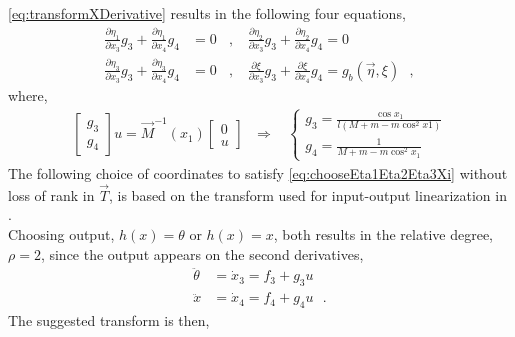 \autoref{eq:transformXDerivative} results in the following four equations,
\begin{align}
    \frac{\partial \eta_1}{\partial x_3} g_3 + \frac{\partial \eta_1}{\partial x_4} g_4 &= 0                    \ \ \ \ ,\ \ \ \ %
    \frac{\partial \eta_2}{\partial x_3} g_3 + \frac{\partial \eta_2}{\partial x_4} g_4 = 0         \nonumber   \\ %
    \frac{\partial \eta_3}{\partial x_3} g_3 + \frac{\partial \eta_3}{\partial x_4} g_4 &= 0                    \ \ \ \ ,\ \ \ \ %
    \frac{\partial \xi   }{\partial x_3} g_3 + \frac{\partial \xi   }{\partial x_4} g_4 = g_b(\vec{\eta},\xi)  \label{eq:chooseEta1Eta2Eta3Xi} 
\ \ \ ,
\end{align}
where,
\begin{align}
  \begin{bmatrix}
    g_3  \\
    g_4
  \end{bmatrix} u = \vec{M}^{-1}(x_1) 
    \begin{bmatrix}
      0  \\
      u
    \end{bmatrix} \ \ \ \Rightarrow \ \ \ \ 
  \begin{cases}
    g_3 = \frac{\cos x_1}{l (M + m - m \cos^2 x1)}\\
    g_4 = \frac{1}{M + m - m \cos^2 x_1 }
  \end{cases}
  \label{eq:g_3_and_4} 
\end{align}
%
The following choice of coordinates to satisfy \autoref{eq:chooseEta1Eta2Eta3Xi} without loss of rank in $\vec{T}$, is based on the transform used for input-output linearization in \cite{HKKhalil}.\\
Choosing output, $h(x) = \theta$ or $h(x) = x$, both results in the relative degree, $\rho = 2$, since the output appears on the second derivatives,
\begin{align}
  \ddot{\theta} &= \dot{x}_3 = f_3 + g_3 u
  \label{eq:thetaRelativeDeg} \\
  \ddot{x} &= \dot{x}_4 = f_4 + g_4 u \ \ \ .
  \label{eq:xRelativeDeg} 
\end{align}
The suggested transform is then,
